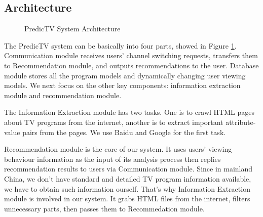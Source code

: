 \subsection{Architecture}
\label{sec:archi}
\begin{figure}[h]
\begin{center}
\caption{PredicTV System Architecture}
\shrink
\label{fig:archi}
\end{center}
\end{figure}

The PredicTV system can be basically into four parts, 
showed in Figure \ref{fig:archi}. 
Communication module receives users' channel switching requests,
transfers them to Recommendation module, and outputs
recommendations to the user. Database module stores all the program
models and dynamically changing user viewing models. We next focus on
the other key components: information extraction module and
recommendation module.

The Information Extraction module has two tasks. One is to crawl HTML pages  
about TV programs from the internet, another is to extract 
important attribute-value pairs from the pages. 
We use Baidu and Google for the first task. 

Recommendation module is the core of our system. It uses users' viewing
behaviour information as the
input of its analysis process then replies recommendation results to users
via Communication module. Since in mainland China, we don't have standard
and detailed TV program information available, we have to obtain such
information ourself. That's why Information Extraction module is involved
in our system. It grabs HTML files from the internet, filters unnecessary
parts, then passes them to Recommedation module. 


